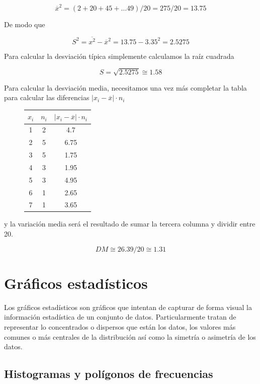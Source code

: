 \documentclass[]{article}
\theoremstyle{plain}
\theoremstyle{definition}
\theoremstyle{definition} %
\begin{document}
\[\overline x^2 = (2+20+45+\ldots 49)/20 = 275/20 = 13.75\]

De modo que

\[S^2 =\overline{x^2} - \overline x^2 = 13.75-3.35^2 = 2.5275\]

Para calcular la desviación típica simplemente calculamos la raíz
cuadrada

\[S= \sqrt{2.5275} \cong 1.58\]

Para calcular la desviación media, necesitamos una vez más completar la
tabla para calcular las diferencias \(|x_i - \overline x|\cdot n_i\)

\begin{figure}
  \centering
\begin{tabular}{ccc}
\(x_i\) & \(n_i\) & \(|x_i - \overline x|\cdot n_i\)\\
\hline
1 & 2 & 4.7 \\
2 & 5 & 6.75\\
3 & 5 & 1.75\\
4 & 3 & 1.95\\
5 & 3 & 4.95\\
6 & 1 & 2.65\\
7 & 1 & 3.65\\
\end{tabular}
\end{figure}

y la variación media será el resultado de sumar la tercera columna y
dividir entre 20.

\[DM \cong 26.39/20\cong 1.31\]

\hypertarget{gruxe1ficos-estaduxedsticos}{%
\section{Gráficos estadísticos}\label{gruxe1ficos-estaduxedsticos}}

Los gráficos estadísticos son gráficos que intentan de capturar de forma
visual la información estadística de un conjunto de datos.
Particularmente tratan de representar lo concentrados o dispersos que
están los datos, los valores más comunes o más centrales de la
distribución así como la simetría o asimetría de los datos.

\hypertarget{histogramas-y-poluxedgonos-de-frecuencias}{%
\subsection{Histogramas y polígonos de
frecuencias}\label{histogramas-y-poluxedgonos-de-frecuencias}}
\end{document}
